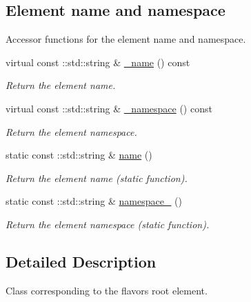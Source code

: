 \subsection*{Element name and namespace}
\label{_amgrpd4b5b61f6e07390f4af2465e04571f34}
Accessor functions for the element name and namespace. \begin{DoxyCompactItemize}
\item 
virtual const ::std::string \& \hyperlink{classopenstack_1_1xml_1_1Flavors___a6769685fd07fc02e1f34a9d3f302ead5}{\_\-name} () const 
\begin{DoxyCompactList}\small\item\em Return the element name. \item\end{DoxyCompactList}\item 
virtual const ::std::string \& \hyperlink{classopenstack_1_1xml_1_1Flavors___a143c0382a7b474c9043ab39b9dd3e8fc}{\_\-namespace} () const 
\begin{DoxyCompactList}\small\item\em Return the element namespace. \item\end{DoxyCompactList}\item 
static const ::std::string \& \hyperlink{classopenstack_1_1xml_1_1Flavors___a0506e874f549be7af2290d2041cf9b14}{name} ()
\begin{DoxyCompactList}\small\item\em Return the element name (static function). \item\end{DoxyCompactList}\item 
static const ::std::string \& \hyperlink{classopenstack_1_1xml_1_1Flavors___a57c59c8b08c281a0d4e18ad87927812f}{namespace\_\-} ()
\begin{DoxyCompactList}\small\item\em Return the element namespace (static function). \item\end{DoxyCompactList}\end{DoxyCompactItemize}


\subsection{Detailed Description}
Class corresponding to the flavors root element. 

